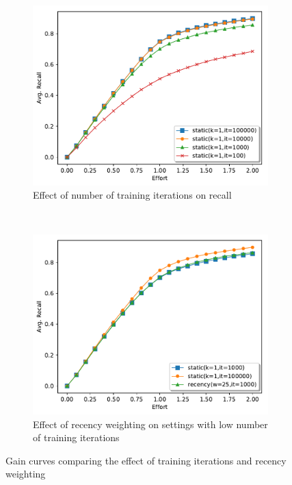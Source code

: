 \begin{figure}
    \centering
    \begin{subfigure}[b]{0.48\textwidth}
        \centering
        \includegraphics[width=\textwidth]{plots/training.pdf}
        \caption{Effect of number of training iterations on recall}
        \label{plot:train}
    \end{subfigure}
    ~
    \begin{subfigure}[b]{0.48\textwidth}
        \centering
        \includegraphics[width=\textwidth]{plots/recency.pdf}
        \caption{Effect of recency weighting on settings with low number of
        training iterations}
        \label{plot:recency}
    \end{subfigure}
    \caption{Gain curves comparing the effect of training iterations and recency
    weighting}
\end{figure}

